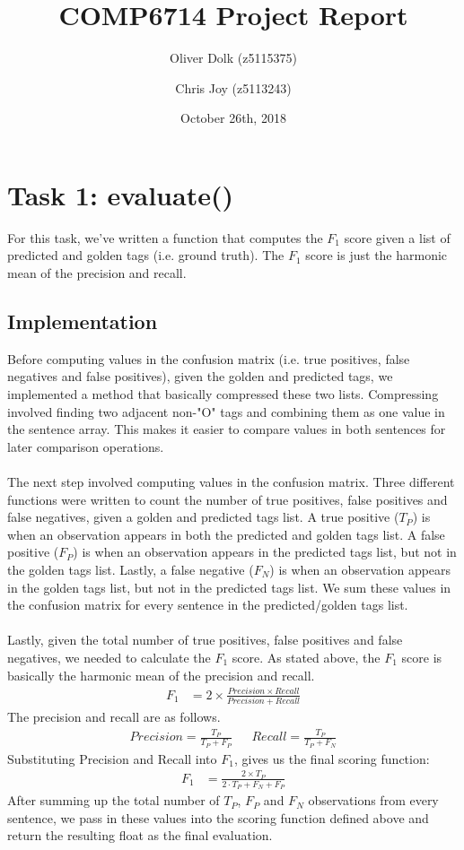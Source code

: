 \documentclass{article}
\title{\textbf{COMP6714 Project Report}}
\author{Oliver Dolk (z5115375) \and Chris Joy (z5113243)}
\date{October 26th, 2018}
\newcommand{\p}{\\\\}
\begin{document}
\maketitle

\section*{Task 1: evaluate()}
For this task, we've written a function that computes the $F_1$ score given a list of predicted and golden tags (i.e. ground truth). The $F_1$ score is just the harmonic mean of the precision and recall.
\subsection*{Implementation}
Before computing values in the confusion matrix (i.e. true positives, false negatives and false positives), given the golden and predicted tags, we implemented a method that basically compressed these two lists. Compressing involved finding two adjacent non-"O" tags and combining them as one value in the sentence array. This makes it easier to compare values in both sentences for later comparison operations. \p
The next step involved computing values in the confusion matrix. Three different functions were written to count the number of true positives, false positives and false negatives, given a golden and predicted tags list. A true positive ($T_P$) is when an observation appears in both the predicted and golden tags list. A false positive ($F_P$) is when an observation appears in the predicted tags list, but not in the golden tags list. Lastly, a false negative ($F_N$) is when an observation appears in the golden tags list, but not in the predicted tags list. We sum these values in the confusion matrix for every sentence in the predicted/golden tags list. \p
Lastly, given the total number of true positives, false positives and false negatives, we needed to calculate the $F_1$ score. As stated above, the $F_1$ score is basically the harmonic mean of the precision and recall.
\begin{align*}
F_1 &= 2 \times \frac{Precision \times Recall}{Precision + Recall}
\end{align*}
The precision and recall are as follows.
\begin{align*}
Precision = \frac{T_P}{T_P + F_P}~~~~~~~
Recall = \frac{T_P}{T_P + F_N}
\end{align*}
Substituting Precision and Recall into $F_1$, gives us the final scoring function:
\begin{align*}
F_1 &= \frac{2 \times T_P}{ 2 \cdot T_P + F_N + F_P}
\end{align*}
After summing up the total number of $T_P$, $F_P$ and $F_N$ observations from every sentence, we pass in these values into the scoring function defined above and return the resulting float as the final evaluation.
\end{document}
